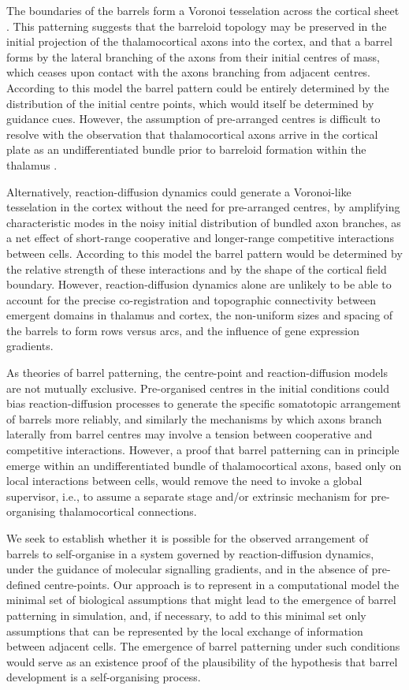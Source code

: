 \documentclass[9pt,twocolumn,twoside,lineno]{pnas-new}
\begin{document}
The boundaries of the barrels form a Voronoi tesselation across the cortical
sheet \citep{senft_mouse_1991}. This patterning suggests that the barreloid
topology may be preserved in the initial projection of the thalamocortical
axons into the cortex, and that a barrel forms by the lateral branching of the
axons from their initial centres of mass, which ceases upon contact with the
axons branching from adjacent centres. According to this model the barrel
pattern could be entirely determined by the distribution of the initial centre
points, which would itself be determined by guidance cues. However, the
assumption of pre-arranged centres is difficult to resolve with the
observation that thalamocortical axons arrive in the cortical plate as an
undifferentiated bundle prior to barreloid formation within the thalamus
\cite{agmon_organized_1993}. %

Alternatively, reaction-diffusion dynamics could generate a Voronoi-like
tesselation in the cortex without the need for pre-arranged centres, by
amplifying characteristic modes in the noisy initial distribution of bundled
axon branches, as a net effect of short-range cooperative and longer-range
competitive interactions between cells. According to this model the barrel
pattern would be determined by the relative strength of these interactions and
by the shape of the cortical field boundary. However, reaction-diffusion
dynamics alone are unlikely to be able to account for the precise
co-registration and topographic connectivity between emergent domains in
thalamus and cortex, the non-uniform sizes and spacing of the barrels to form
rows versus arcs, and the influence of gene expression gradients.

As theories of barrel patterning, the centre-point and reaction-diffusion
models are not mutually exclusive. Pre-organised centres in the initial
conditions could bias reaction-diffusion processes to generate the specific
somatotopic arrangement of barrels more reliably, and similarly the mechanisms
by which axons branch laterally from barrel centres may involve a tension
between cooperative and competitive interactions. However, a proof that barrel
patterning can in principle emerge within an undifferentiated bundle of
thalamocortical axons, based only on local interactions between cells, would
remove the need to invoke a global supervisor, i.e., to assume a separate
stage and/or extrinsic mechanism for pre-organising thalamocortical
connections.

We seek to establish whether it is possible for the observed arrangement of
barrels to self-organise in a system governed by reaction-diffusion dynamics,
under the guidance of molecular signalling gradients, and in the absence of
pre-defined centre-points.
%
Our approach is to represent in a computational model the minimal set of
biological assumptions that might lead to the emergence of barrel patterning
in simulation, and, if necessary, to add to this minimal set only assumptions
that can be represented by the local exchange of information between adjacent
cells. The emergence of barrel patterning under such conditions would serve as
an existence proof of the plausibility of the hypothesis that barrel
development is a self-organising process.
\end{document}
